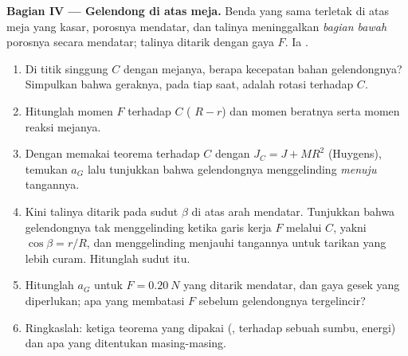 \begin{problem}
\medskip
\noindent\textbf{Bagian IV --- Gelendong di atas meja.}
Benda yang sama terletak di atas meja yang kasar, porosnya mendatar, dan talinya
meninggalkan \emph{bagian bawah} porosnya secara mendatar; talinya ditarik dengan
gaya $F$. Ia .
\begin{enumerate}[resume]
  \item Di titik singgung $C$ dengan mejanya, berapa kecepatan
        bahan gelendongnya? Simpulkan bahwa geraknya, pada tiap
        saat, adalah rotasi terhadap $C$.
  \item Hitunglah momen $F$ terhadap $C$ ( $R - r$) dan momen
        beratnya serta momen reaksi mejanya.
  \item Dengan memakai teorema  terhadap $C$ dengan $J_C = J +
        MR^2$ (Huygens), temukan $a_G$ lalu tunjukkan bahwa gelendongnya menggelinding
        \emph{menuju} tangannya.
  \item Kini talinya ditarik pada sudut $\beta$ di atas arah
        mendatar. Tunjukkan bahwa gelendongnya tak menggelinding ketika garis
        kerja $F$ melalui $C$, yakni $\cos\beta = r/R$, dan
        menggelinding menjauhi tangannya untuk tarikan yang lebih curam. Hitunglah sudut itu.
  \item Hitunglah $a_G$ untuk $F = \qty{0.20}{N}$ yang ditarik mendatar, dan
        gaya gesek yang diperlukan; apa yang membatasi $F$ sebelum gelendongnya
        tergelincir?
  \item Ringkaslah: ketiga teorema yang dipakai (,  terhadap sebuah sumbu, energi) dan apa yang ditentukan masing-masing.
\end{enumerate}
\end{problem}
